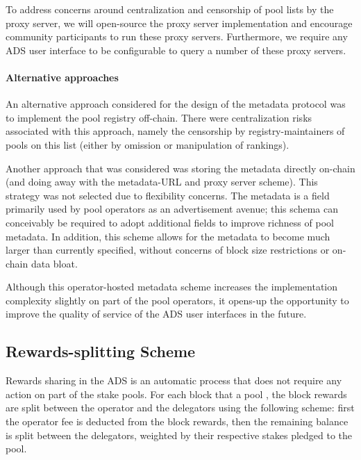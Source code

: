To address concerns around centralization and censorship of pool lists by the proxy server, we will open-source the proxy server implementation and encourage community participants to run these proxy servers. Furthermore, we require any ADS user interface to be configurable to query a number of these proxy servers.

\paragraph{Alternative approaches} An alternative approach considered for the design of the metadata protocol was to implement the pool registry off-chain. There were centralization risks associated with this approach, namely the censorship by registry-maintainers of pools on this list (either by omission or manipulation of rankings). 

Another approach that was considered was storing the metadata directly on-chain (and doing away with the metadata-URL and proxy server scheme). This strategy was not selected due to flexibility concerns. The metadata is a field primarily used by pool operators as an advertisement avenue; this schema can conceivably be required to adopt additional fields to improve richness of pool metadata. In addition, this scheme allows for the metadata to become much larger than currently specified, without concerns of block size restrictions or on-chain data bloat. 

Although this operator-hosted metadata scheme increases the implementation complexity slightly on part of the pool operators, it opens-up the opportunity to improve the quality of service of the ADS user interfaces in the future. 

\subsection{Rewards-splitting Scheme} \label{rewards_splitting}

Rewards sharing in the ADS is an automatic process that does not require any action on part of the stake pools. For each block that a pool , the block rewards are split between the operator and the delegators using the following scheme: first the operator fee is deducted from the block rewards, then the remaining balance is split between the delegators, weighted by their respective stakes pledged to the pool.

